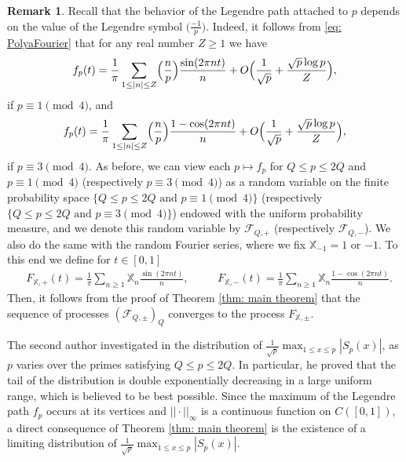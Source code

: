 \documentclass[10pt]{amsart}
\theoremstyle{plain}
\theoremstyle{definition}
\newtheorem{rem}[thm]{Remark}
\newcommand{\Legendre}[2]{\Bigl(\dfrac{#1}{#2}\Bigr)}
\newcommand{\legendre}[2]{\bigl(\tfrac{#1}{#2}\bigr)}
\newcommand{\X}{\mathbb{X}}
\begin{document}
\begin{rem} Recall that the behavior of the Legendre path attached to $p$ depends on the value of the Legendre symbol $\legendre{-1}{p}$. Indeed, it follows from \eqref{eq: PolyaFourier} that for any real number $Z\geq 1$ we have
\begin{equation} \label{eq: Polya1mod4}f_p(t) = \frac{1}{\pi } \sum_{1 \leq |n| \leq Z} \Legendre{n}{p} \frac{\sin(2\pi n t)}{n} + O\Bigl(\frac{1}{\sqrt{p}}+\frac{\sqrt{p}\log p}{Z}\Bigr),
\end{equation}
if $p\equiv 1 \pmod 4$, and
\begin{equation} \label{eq: Polya3mod4}f_p(t) = \frac{1}{\pi } \sum_{1 \leq |n| \leq Z} \Legendre{n}{p} \frac{1-\cos(2\pi n t)}{n} + O\Bigl(\frac{1}{\sqrt{p}}+\frac{\sqrt{p}\log p}{Z}\Bigr),
\end{equation}
if $p\equiv 3\pmod 4$. As before, we can view each $p \mapsto f_p$ for $Q\leq p\leq 2Q$ and $p\equiv 1\pmod 4$ (respectively $p\equiv 3\pmod 4$) as a random variable on the finite probability space $\{Q\leq p\leq 2Q \text{ and } p\equiv 1\pmod 4\}$ (respectively $\{Q\leq p\leq 2Q \text{ and } p\equiv 3\pmod 4\}$) endowed with the uniform probability measure, and we denote this random variable by $\mathcal{F}_{Q, +}$ (respectively $\mathcal{F}_{Q, -}$). We also
do the same with the random Fourier series, where we fix $\X_{-1} = 1$ or $-1$. To this end we define for $t\in [0, 1]$
\begin{align*}
&F_{\X,+}(t) = \frac{1}{\pi} \sum_{n \geq 1} \X_n \frac{\sin(2\pi nt)}{n}, &\quad &F_{\X,-}(t) = \frac{1}{\pi} \sum_{n \geq 1} \X_n \frac{1 - \cos(2 \pi n t)}{n}.
\end{align*}
Then, it follows from the proof of Theorem \ref{thm: main theorem} that the sequence of processes $(\mathcal{F}_{Q, \pm})_{Q}$ converges to the process $F_{\X, \pm}$.
\end{rem}

The second author investigated in \cite{La} the distribution of $\frac{1}{\sqrt{p}}\max_{1\leq x\leq p} |S_p(x)|$, as $p$ varies over the primes satisfying $Q\leq p\leq 2Q$. In particular, he proved that the tail of the distribution is double exponentially decreasing in a large uniform range, which is believed to be best possible. Since the maximum of the Legendre path $f_p$ occurs at its vertices and $||\cdot||_{\infty}$ is a continuous function on $C([0,1])$, a direct consequence of Theorem \ref{thm: main theorem} is the existence of a limiting distribution of $\frac{1}{\sqrt{p}}\max_{1\leq x\leq p} |S_p(x)|$.
\end{document}
